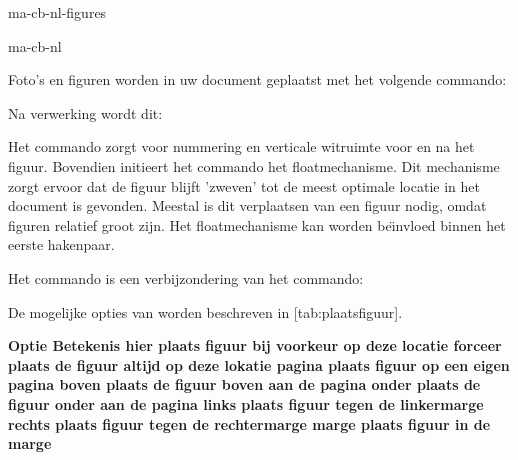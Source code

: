 \startonderdeel ma-cb-nl-figures

\produkt ma-cb-nl




Foto's en figuren worden in uw document geplaatst met het
volgende commando:

\startbuffer
{}
   {\externfiguur[ma-cb-24][breedte=.4\tekstbreedte]}
\stopbuffer

\typebuffer

Na verwerking wordt dit:

\haalbuffer

Het commando \type{\plaatsfiguur} zorgt voor nummering en
verticale witruimte voor en na het figuur. Bovendien
initieert het commando het floatmechanisme. Dit mechanisme
zorgt ervoor dat de figuur blijft 'zweven' tot de meest
optimale locatie in het document is gevonden. Meestal is dit
verplaatsen van een figuur nodig, omdat figuren relatief
groot zijn. Het floatmechanisme kan worden be\"{\i}nvloed binnen
het eerste hakenpaar.

Het commando \type{\plaatsfiguur} is een verbijzondering van
het commando:


De mogelijke opties van \type{\plaatsfiguur} worden
beschreven in [tab:plaatsfiguur].

\starttabel[|l|l|]
\HL
\NC \bf Optie \NC \bf Betekenis \NC\SR
\HL
\NC hier       \NC  plaats figuur bij voorkeur op deze locatie  \NC\FR
\NC forceer    \NC  plaats de figuur altijd op deze lokatie     \NC\MR
\NC pagina     \NC  plaats figuur op een eigen pagina           \NC\MR
\NC boven      \NC  plaats de figuur boven aan de pagina        \NC\MR
\NC onder      \NC  plaats de figuur onder aan de pagina        \NC\MR
\NC links      \NC  plaats figuur tegen de linkermarge          \NC\MR
\NC rechts     \NC  plaats figuur tegen de rechtermarge         \NC\MR
\NC marge      \NC  plaats figuur in de marge                   \NC\LR
\HL
\stoptabel

